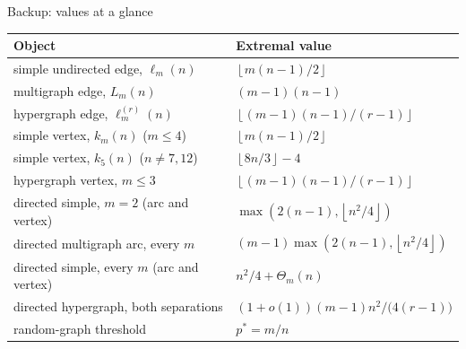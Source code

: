 \documentclass[aspectratio=1610,11pt]{beamer}
\newcommand{\floor}[1]{\left\lfloor #1\right\rfloor}
\begin{document}
\begin{frame}{Backup: values at a glance}
\vfill
\centering\renewcommand{\arraystretch}{1.15}\small
\begin{tabular}{@{}ll@{}}
  \toprule
  Object & Extremal value \\
  \midrule
  simple undirected edge, $\ell_m(n)$ & $\floor{m(n-1)/2}$ \\
  multigraph edge, $L_m(n)$ & $(m-1)(n-1)$ \\
  hypergraph edge, $\ell_m^{(r)}(n)$ & $\floor{(m-1)(n-1)/(r-1)}$ \\
  simple vertex, $k_m(n)$ \;($m\le4$) & $\floor{m(n-1)/2}$ \\
  simple vertex, $k_5(n)$ \;($n\ne7,12$) & $\floor{8n/3}-4$ \\
  hypergraph vertex, $m\le3$ & $\floor{(m-1)(n-1)/(r-1)}$ \\
  \midrule
  directed simple, $m=2$ \;(arc and vertex) & $\max(2(n-1),\floor{n^2/4})$ \\
  directed multigraph arc, every $m$ & $(m-1)\max(2(n-1),\floor{n^2/4})$ \\
  directed simple, every $m$ \;(arc and vertex) & $n^2/4+\Theta_m(n)$ \\
  directed hypergraph, both separations & $(1+o(1))(m-1)n^2/\bigl(4(r-1)\bigr)$ \\
  \midrule
  random-graph threshold & $p^\ast=m/n$ \\
  \bottomrule
\end{tabular}
\vfill
\end{frame}
\end{document}
